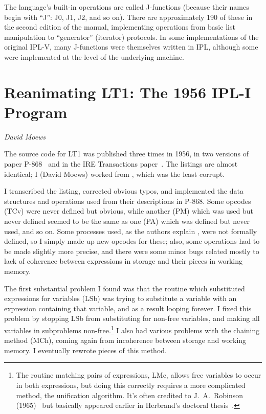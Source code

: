 \documentclass[journal]{IEEEtran}
\begin{document}
The language's built-in operations are called J-functions (because
their names begin with ``J'': J0, J1, J2, and so on). There are
approximately 190 of these in the second edition of the
manual, implementing operations from basic list
manipulation to ``generator'' (iterator) protocols. In some implementations
of the original
IPL-V, many J-functions were themselves written in IPL, although some
were implemented at the level of the underlying machine.

\section{Reanimating LT1: The 1956 IPL-I Program}
\label{sec:lt1}


%
%

{\em David Moews}

The source code for LT1 was published three times in 1956, in two
versions of paper P-868~\cite{LT1956a,LT1956b} and in the 
IRE Transactions paper~\cite{LT1956c}.  The listings are almost identical; I
(David Moews) worked from \cite{LT1956b}, which was the least corrupt.

I transcribed the listing, corrected obvious typos, and
implemented the data structures and operations used from their
descriptions in P-868.  Some opcodes (TCv) were never defined
but obvious, while another (PM) which was used but never defined
seemed to be the same as one (PA) which was defined but never
used, and so on.  Some processes used, as the authors explain
\cite[p.~50]{LT1956b}, were not formally defined, so I simply
made up new opcodes for these; also, some operations had to
be made slightly more precise, and there were some minor bugs
related mostly to lack of coherence between expressions in
storage and their pieces in working memory.  

The first substantial problem I found was that the routine 
which substituted expressions for variables (LSb)
was trying to substitute a variable with an expression
containing that variable, and as a result looping forever.  
I fixed this problem by stopping LSb from substituting
for non-free variables, and making all variables in subproblems
non-free.\footnote{The routine matching pairs of expressions, LMc, allows
free variables to occur in both expressions, but doing this correctly 
requires a more complicated method, the unification algorithm.  It's 
often credited to J.~A.~Robinson (1965)~\cite{robinson1965} but basically
appeared earlier in Herbrand's doctoral thesis~\cite[Section~18]{lecherbrand2009}.}
I also had various problems with the chaining method (MCh),
coming again from incoherence between storage and working
memory.  I eventually rewrote pieces of this method.
\end{document}
